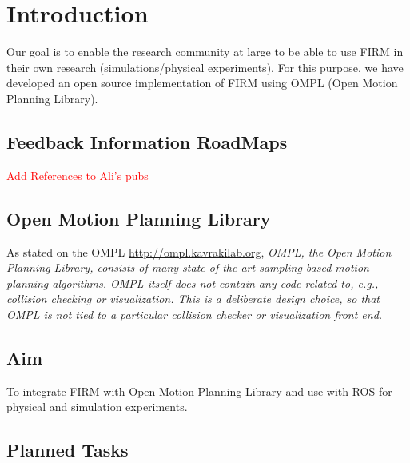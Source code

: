 \chapter{Introduction}

Our goal is to enable the research community at large to be able to use FIRM in their own research (simulations/physical experiments).
For this purpose, we have developed an open source implementation of FIRM using OMPL (Open Motion Planning Library).

\section{Feedback Information RoadMaps}

\textcolor{red}{Add References to Ali's pubs}

\section{Open Motion Planning Library}

As stated on the OMPL \url{http://ompl.kavrakilab.org}, \textit{OMPL, the Open Motion Planning Library, consists of many state-of-the-art sampling-based motion planning algorithms. OMPL itself does not contain any code related to, e.g., collision checking or visualization. This is a deliberate design choice, so that OMPL is not tied to a particular collision checker or visualization front end.}
\section{Aim}

To integrate FIRM with Open Motion Planning Library and use with ROS for physical and simulation experiments.

\section{Planned Tasks}


